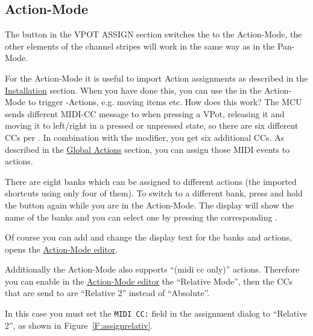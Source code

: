 \subsection{Action-Mode}\label{actionmode} 

The button \eq in the VPOT ASSIGN section switches the \vpots to the
Action-Mode, the other elements of the channel stripes will work in
the same way as in the Pan-Mode.

For the Action-Mode it is useful to import Action assignments as described in
the \hyperref[installation]{Installation} section.
When you have done this, you can use the \vpots in the Action-Mode to
trigger \reaper-Actions, e.g.  moving items etc. How does this work?
The MCU sends different MIDI-CC message to \reaper when pressing a
VPot, releasing it and moving it to left/right in a pressed or
unpressed state, so there are six different CCs per \vpots.  In
combination with the \shift modifier, you get six additional CCs. As
described in the \hyperref[globalactions]{Global Actions} section, you
can assign those MIDI events to \reaper actions.

There are eight banks which can be assigned to different actions (the
imported shortcuts using only four of them). To switch to a different
bank, press and hold the \eq button again while you are in the Action-Mode.
The display will show the name of the banks and you can select one by
pressing the corresponding \vpot.

Of course you can add and change the display text for the banks and
actions, \alt \eq opens the \hyperref[F:Screenshot_Action_Mode]{Action-Mode
editor}.


\vspace{-2mm}
Additionally the Action-Mode also supports  ``(midi cc only)'' actions. Therefore
you can enable in the \hyperref[F:Screenshot_Action_Mode]{Action-Mode
editor} the ``Relative Mode'', then the CCs that are send to \reaper are
``Relative 2'' instead of ``Absolute''. 


In this case you must set the {\tt MIDI CC:} field in the \reaper assignment
dialog to ``Relative 2'', as shown in Figure~\ref{F:assignrelativ}.

